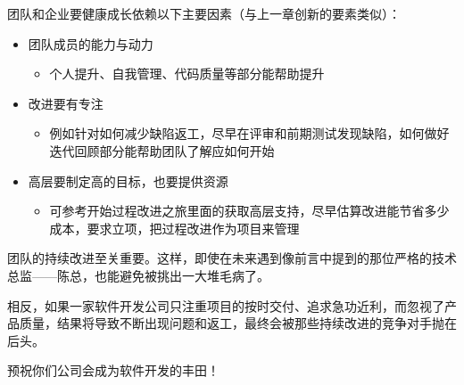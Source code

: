 团队和企业要健康成长依赖以下主要因素（与上一章创新的要素类似）：

\begin{itemize}
\tightlist
\item
  团队成员的能力与动力

  \begin{itemize}
  \tightlist
  \item
    个人提升、自我管理、代码质量等部分能帮助提升
  \end{itemize}
\item
  改进要有专注

  \begin{itemize}
  \tightlist
  \item
    例如针对如何减少缺陷返工，尽早在评审和前期测试发现缺陷，如何做好迭代回顾部分能帮助团队了解应如何开始
  \end{itemize}
\item
  高层要制定高的目标，也要提供资源

  \begin{itemize}
  \tightlist
  \item
    可参考开始过程改进之旅里面的获取高层支持，尽早估算改进能节省多少成本，要求立项，把过程改进作为项目来管理
  \end{itemize}
\end{itemize}

团队的持续改进至关重要。这样，即使在未来遇到像前言中提到的那位严格的技术总监------陈总，也能避免被挑出一大堆毛病了。

相反，如果一家软件开发公司只注重项目的按时交付、追求急功近利，而忽视了产品质量，结果将导致不断出现问题和返工，最终会被那些持续改进的竞争对手抛在后头。

预祝你们公司会成为软件开发的丰田！

\begin{description}
\item[]
\end{description}


